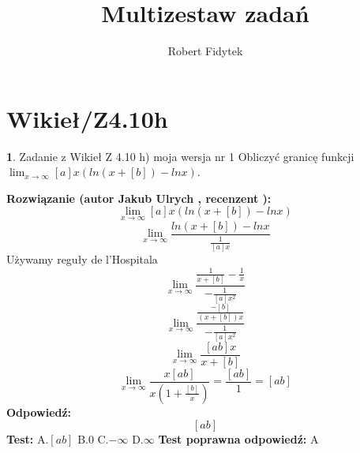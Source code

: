 \documentclass[12pt, a4paper]{article}
\title{Multizestaw zadań}
\author{Robert Fidytek}
\date{}
\theoremstyle{definition} %
\newtheorem{zad}{}
\newcommand{\kategoria}[1]{\section{#1}} %
\newcommand{\zadStart}[1]{\begin{zad}#1\newline} %
\newcommand{\zadStop}{\end{zad}}   %
\newcommand{\rozwStart}[2]{\noindent \textbf{Rozwiązanie (autor #1 , recenzent #2): }\newline} %
\newcommand{\rozwStop}{\newline}                                            %
\newcommand{\odpStart}{\noindent \textbf{Odpowiedź:}\newline}    %
\newcommand{\odpStop}{\newline}                                             %
\newcommand{\testStart}{\noindent \textbf{Test:}\newline} %
\newcommand{\testStop}{\newline} %
\newcommand{\kluczStart}{\noindent \textbf{Test poprawna odpowiedź:}\newline} %
\newcommand{\kluczStop}{\newline} %
\begin{document}
\maketitle


\kategoria{Wikieł/Z4.10h}
\zadStart{Zadanie z Wikieł Z 4.10 h) moja wersja nr 1}
Obliczyć granicę funkcji $\lim_{x \to \infty}[a]x(ln(x+[b])-lnx)$.
\zadStop
\rozwStart{Jakub Ulrych}{}
$$\lim_{x \to \infty}[a]x(ln(x+[b])-lnx)$$
$$\lim_{x \to \infty}\frac{ln(x+[b])-lnx}{\frac{1}{[a]x}}$$
Używamy reguły de l'Hospitala
$$\lim_{x \to \infty}\frac{\frac{1}{x+[b]}-\frac{1}{x}}{-\frac{1}{[a]x^{2}}}$$
$$\lim_{x \to \infty}\frac{\frac{-[b]}{(x+[b])x}}{-\frac{1}{[a]x^{2}}}$$
$$\lim_{x \to \infty}\frac{[ab]x}{x+[b]}$$
$$\lim_{x \to \infty}\frac{x[ab]}{x(1+\frac{[b]}{x})}=\frac{[ab]}{1}=[ab]$$
\rozwStop
\odpStart
$$[ab]$$
\odpStop
\testStart
A.$[ab]$
B.$0$
C.$-\infty$
D.$\infty$
\testStop
\kluczStart
A
\kluczStop
\end{document}
